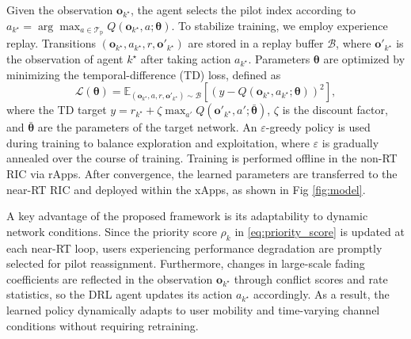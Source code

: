 \documentclass[10pt, conference]{IEEEtran}
\begin{document}
Given the observation $\mathbf{o}_{k^\star}$, the agent selects the pilot index according to $a_{k^\star} = \arg\max_{a \in \mathcal{T}_\mathrm{p}} Q\!\left(\mathbf{o}_{k^\star}, a; \boldsymbol{\theta}\right)$.
To stabilize training, we employ experience replay. Transitions $\left(\mathbf{o}_{k^\star}, a_{k^\star}, r, \mathbf{o}'_{k^\star}\right)$ are stored in a replay buffer $\mathcal{B}$, where $\mathbf{o}'_{k^\star}$ is the observation of agent ${k^\star}$ after taking action $a_{k^\star}$. Parameters $\boldsymbol{\theta}$ are optimized by minimizing the temporal-difference (TD) loss, defined as
\begin{equation}\label{eq:TD_loss}
    \mathcal{L}(\boldsymbol{\theta})
    =
    \mathbb{E}_{\left(\mathbf{o}_{k^\star}, a, r, \mathbf{o}'_{k^\star}\right) \sim \mathcal{B}}
    \!\left[
    \left(
    y - Q\!\left(\mathbf{o}_{k^\star}, a_{k^\star}; \boldsymbol{\theta}\right)
    \right)^2
    \right],
\end{equation}
where the TD target $y = r_{k^\star} + \zeta \max_{a'} Q\!\left(\mathbf{o}'_{k^\star}, a'; \bar{\boldsymbol{\theta}}\right)$, $\zeta$ is the discount factor, and $\bar{\boldsymbol{\theta}}$ are the parameters of the target network. An $\varepsilon$-greedy policy is used during training to balance exploration and exploitation, where $\varepsilon$ is gradually annealed over the course of training. 
Training is performed offline in the non-RT RIC via rApps. After convergence, the learned parameters are transferred to the near-RT RIC and deployed within the xApps, as shown in Fig \ref{fig:model}.

A key advantage of the proposed framework is its adaptability to dynamic network conditions. Since the priority score $\rho_k$ in \eqref{eq:priority_score} is updated at each near-RT loop, users experiencing performance degradation are promptly selected for pilot reassignment. Furthermore, changes in large-scale fading coefficients are reflected in the observation $\mathbf{o}_{k^\star}$ through conflict scores and rate statistics, so the DRL agent updates its action $a_{k^\star}$ accordingly. As a result, the learned policy dynamically adapts to user mobility and time-varying channel conditions without requiring retraining.
\end{document}
